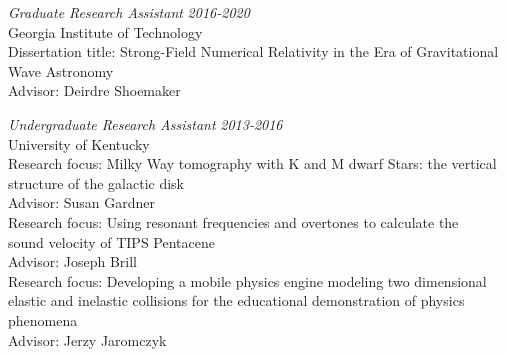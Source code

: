 \documentclass[11pt]{article}
\begin{document}
\begin{flushleft}
 \vspace{8px}  
  
  \textit{Graduate Research Assistant} \hfill \textit{2016-2020}\\
  Georgia Institute of Technology\\
  Dissertation title: Strong-Field Numerical Relativity in the Era of Gravitational\\ Wave Astronomy\\
  Advisor: Deirdre Shoemaker\\
  
  \vspace{8px}
	
  \textit{Undergraduate Research Assistant} \hfill \textit{2013-2016}\\
  University of Kentucky\\
  Research focus: Milky Way tomography with K and M dwarf Stars: the vertical\\ structure of the galactic disk\\ 
  Advisor: Susan Gardner\\
  \vspace{2px}
  Research focus: Using resonant frequencies and overtones to calculate the\\ sound velocity of TIPS Pentacene\\
  Advisor: Joseph Brill\\
  \vspace{2px}
  Research focus: Developing a mobile physics engine modeling two dimensional\\ elastic and inelastic collisions for the educational demonstration of physics phenomena\\
  Advisor: Jerzy Jaromczyk\\
  
  \vspace{8px}
	

\end{flushleft}
\end{document}
